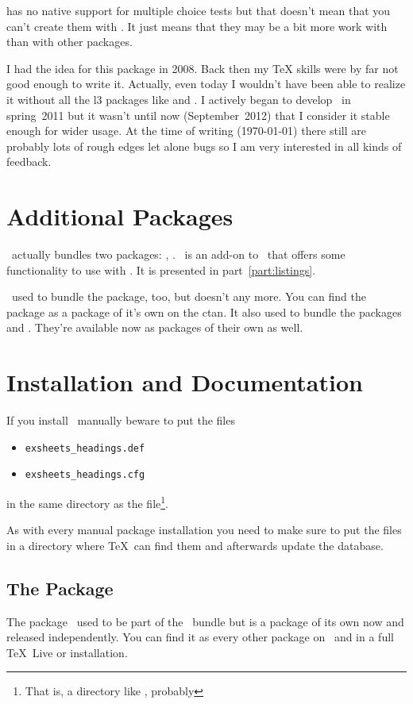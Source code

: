 \documentclass[load-preamble+,scrartcl={DIV10}]{cnltx-doc}
\begin{document}
\ExSheets{} has no native support for multiple choice tests but that doesn't
mean that you can't create them with \ExSheets.  It just means that they may
be a bit more work with \ExSheets{} than with other packages.

I had the idea for this package in 2008.  Back then my \TeX{} skills were by
far not good enough to write it.  Actually, even today I wouldn't have been
able to realize it without all the l3 packages like  and
.  I actively began to develop \ExSheets\ in spring~2011 but
it wasn't until now (September~2012) that I consider it stable enough for
wider usage.  At the time of writing (\today) there still are probably lots of
rough edges let alone bugs so I am very interested in all kinds of feedback.

\section{Additional Packages}
\ExSheets\ actually bundles two packages: \ExSheets, \ExSheetslistings.
\ExSheetslistings\ is an add-on to \ExSheets\ that offers some functionality
to use  with \ExSheets.  It is presented in
part~\ref{part:listings}.

\ExSheets\ used to bundle the  package,
too, but doesn't any more.  You can find the
 package as a package of it's own on the \ac{ctan}.  It also
used to bundle the packages  and
.  They're available now as packages of
their own as well.

\section{Installation and Documentation}
If you install \ExSheets\ manually beware to put the files
\begin{itemize}
  \item[]\verb+exsheets_headings.def+
  \item[]\verb+exsheets_headings.cfg+
\end{itemize}
in the same directory as the  file\footnote{That is, a
  directory like , probably}.

As with every manual package installation you need to make sure to put the
files in a directory where \TeX\ can find them and afterwards update the
database.

\subsection{The  Package}
The  package~\cite{pkg:tasks} used to be part of the \ExSheets\
bundle but is a package of its own now and released
independently.  You can find it as every other package on \ctan\ and in a full
\TeX~Live or \hologo{MiKTeX} installation.
\end{document}
